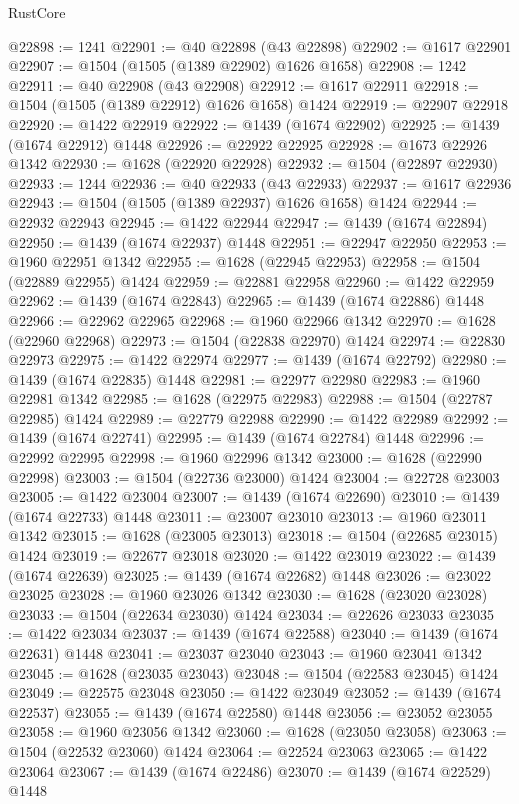 \begin{lexlean}{RustCore}
\begin{coremodule}
@22898 := 1241
@22901 := @40 @22898 (@43 @22898)
@22902 := @1617 @22901
@22907 := @1504 (@1505 (@1389 @22902) @1626 @1658)
@22908 := 1242
@22911 := @40 @22908 (@43 @22908)
@22912 := @1617 @22911
@22918 := @1504 (@1505 (@1389 @22912) @1626 @1658) @1424
@22919 := @22907 @22918
@22920 := @1422 @22919
@22922 := @1439 (@1674 @22902)
@22925 := @1439 (@1674 @22912) @1448
@22926 := @22922 @22925
@22928 := @1673 @22926 @1342
@22930 := @1628 (@22920 @22928)
@22932 := @1504 (@22897 @22930)
@22933 := 1244
@22936 := @40 @22933 (@43 @22933)
@22937 := @1617 @22936
@22943 := @1504 (@1505 (@1389 @22937) @1626 @1658) @1424
@22944 := @22932 @22943
@22945 := @1422 @22944
@22947 := @1439 (@1674 @22894)
@22950 := @1439 (@1674 @22937) @1448
@22951 := @22947 @22950
@22953 := @1960 @22951 @1342
@22955 := @1628 (@22945 @22953)
@22958 := @1504 (@22889 @22955) @1424
@22959 := @22881 @22958
@22960 := @1422 @22959
@22962 := @1439 (@1674 @22843)
@22965 := @1439 (@1674 @22886) @1448
@22966 := @22962 @22965
@22968 := @1960 @22966 @1342
@22970 := @1628 (@22960 @22968)
@22973 := @1504 (@22838 @22970) @1424
@22974 := @22830 @22973
@22975 := @1422 @22974
@22977 := @1439 (@1674 @22792)
@22980 := @1439 (@1674 @22835) @1448
@22981 := @22977 @22980
@22983 := @1960 @22981 @1342
@22985 := @1628 (@22975 @22983)
@22988 := @1504 (@22787 @22985) @1424
@22989 := @22779 @22988
@22990 := @1422 @22989
@22992 := @1439 (@1674 @22741)
@22995 := @1439 (@1674 @22784) @1448
@22996 := @22992 @22995
@22998 := @1960 @22996 @1342
@23000 := @1628 (@22990 @22998)
@23003 := @1504 (@22736 @23000) @1424
@23004 := @22728 @23003
@23005 := @1422 @23004
@23007 := @1439 (@1674 @22690)
@23010 := @1439 (@1674 @22733) @1448
@23011 := @23007 @23010
@23013 := @1960 @23011 @1342
@23015 := @1628 (@23005 @23013)
@23018 := @1504 (@22685 @23015) @1424
@23019 := @22677 @23018
@23020 := @1422 @23019
@23022 := @1439 (@1674 @22639)
@23025 := @1439 (@1674 @22682) @1448
@23026 := @23022 @23025
@23028 := @1960 @23026 @1342
@23030 := @1628 (@23020 @23028)
@23033 := @1504 (@22634 @23030) @1424
@23034 := @22626 @23033
@23035 := @1422 @23034
@23037 := @1439 (@1674 @22588)
@23040 := @1439 (@1674 @22631) @1448
@23041 := @23037 @23040
@23043 := @1960 @23041 @1342
@23045 := @1628 (@23035 @23043)
@23048 := @1504 (@22583 @23045) @1424
@23049 := @22575 @23048
@23050 := @1422 @23049
@23052 := @1439 (@1674 @22537)
@23055 := @1439 (@1674 @22580) @1448
@23056 := @23052 @23055
@23058 := @1960 @23056 @1342
@23060 := @1628 (@23050 @23058)
@23063 := @1504 (@22532 @23060) @1424
@23064 := @22524 @23063
@23065 := @1422 @23064
@23067 := @1439 (@1674 @22486)
@23070 := @1439 (@1674 @22529) @1448

\end{coremodule}
\end{lexlean}

